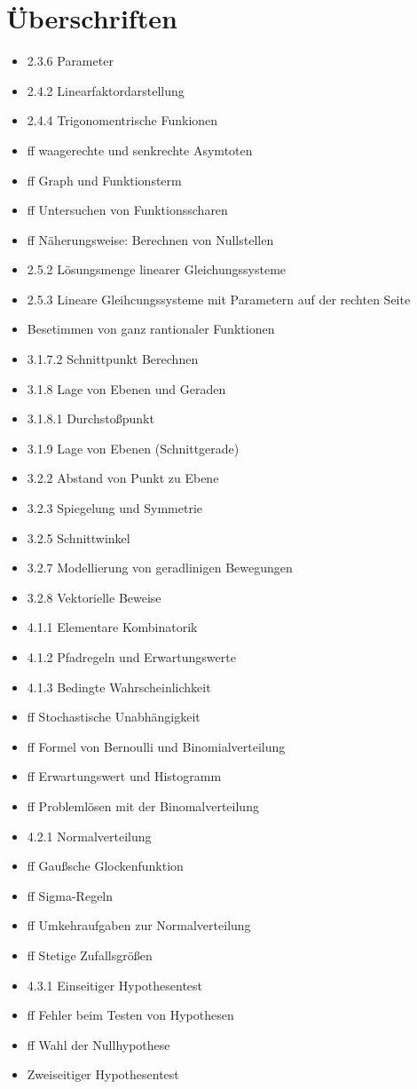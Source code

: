 \section{Überschriften}
\begin{itemize}
    \item 2.3.6 Parameter
    \item 2.4.2 Linearfaktordarstellung
    \item 2.4.4 Trigonomentrische Funkionen
    \item ff waagerechte und senkrechte Asymtoten
    \item ff Graph und Funktionsterm
    \item ff Untersuchen von Funktionsscharen
    \item ff Näherungsweise: Berechnen von Nullstellen
    \item 2.5.2 Lösungsmenge linearer Gleichungssysteme
    \item 2.5.3 Lineare Gleihcungssysteme mit Parametern auf der rechten Seite
    \item Besetimmen von ganz rantionaler Funktionen
    \item 3.1.7.2 Schnittpunkt Berechnen
    \item 3.1.8 Lage von Ebenen und Geraden
    \item 3.1.8.1 Durchstoßpunkt
    \item 3.1.9 Lage von Ebenen (Schnittgerade)
    \item 3.2.2 Abstand von Punkt zu Ebene
    \item 3.2.3 Spiegelung und Symmetrie
    \item 3.2.5 Schnittwinkel
    \item 3.2.7 Modellierung von geradlinigen Bewegungen
    \item 3.2.8 Vektorielle Beweise
    \item 4.1.1 Elementare Kombinatorik
    \item 4.1.2 Pfadregeln und Erwartungswerte
    \item 4.1.3 Bedingte Wahrscheinlichkeit
    \item ff Stochastische Unabhängigkeit
    \item ff Formel von Bernoulli und Binomialverteilung
    \item ff Erwartungswert und Histogramm
    \item ff Problemlösen mit der Binomalverteilung
    \item 4.2.1 Normalverteilung
    \item ff Gaußsche Glockenfunktion
    \item ff Sigma-Regeln
    \item ff Umkehraufgaben zur Normalverteilung
    \item ff Stetige Zufallsgrößen 
    \item 4.3.1 Einseitiger Hypothesentest
    \item ff Fehler beim Testen von Hypothesen
    \item ff Wahl der Nullhypothese
    \item Zweiseitiger Hypothesentest
\end{itemize}


